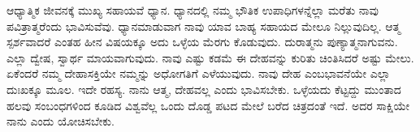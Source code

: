 ಆಧ್ಯಾತ್ಮಿಕ ಜೀವನಕ್ಕೆ ಮುಖ್ಯ ಸಹಾಯವೆ ಧ್ಯಾನ. ಧ್ಯಾನದಲ್ಲಿ ನಮ್ಮ ಭೌತಿಕ ಉಪಾಧಿಗಳನ್ನೆಲ್ಲಾ ಮರೆತು ನಾವು ಪವಿತ್ರಾತ್ಮರೆಂದು ಭಾವಿಸುವೆವು. ಧ್ಯಾನಮಾಡುವಾಗ ನಾವು ಯಾವ ಬಾಹ್ಯ ಸಹಾಯದ ಮೇಲೂ ನಿಲ್ಲುವುದಿಲ್ಲ. ಆತ್ಮ ಸ್ಪರ್ಶವಾದರೆ ಎಂತಹ ಹೀನ ವಿಷಯಕ್ಕೂ ಅದು ಒಳ್ಳೆಯ ಮೆರಗು ಕೊಡುವುದು. ದುರಾತ್ಮನು ಪುಣ್ಯಾತ್ಮನಾಗುವನು. ಎಲ್ಲಾ ದ್ವೇಷ, ಸ್ವಾರ್ಥ ಮಾಯವಾಗುವುದು. ನಾವು ಎಷ್ಟು ಕಡಮೆ ಈ ದೇಹವನ್ನು ಕುರಿತು ಚಿಂತಿಸಿದರೆ ಅಷ್ಟು ಮೇಲು. ಏಕೆಂದರೆ ನಮ್ಮ ದೇಹಾಸಕ್ತಿಯೇ ನಮ್ಮನ್ನು ಅಧೋಗತಿಗೆ ಎಳೆಯುವುದು. ನಾವು ದೇಹ ಎಂಬ\break ಭಾವನೆಯೇ ಎಲ್ಲಾ ದುಃಖಕ್ಕೂ ಮೂಲ. ಇದೇ ರಹಸ್ಯ. ನಾನು ಆತ್ಮ, ದೇಹವಲ್ಲ ಎಂದು ಭಾವಿಸಬೇಕು. ಒಳ್ಳೆಯದು ಕೆಟ್ಟದ್ದು ಮುಂತಾದ ಹಲವು ಸಂಬಂಧಗಳಿಂದ ಕೂಡಿದ ವಿಶ್ವವೆಲ್ಲ ಒಂದು ದೊಡ್ಡ ಪಟದ ಮೇಲೆ ಬರೆದ ಚಿತ್ರದಂತೆ ಇದೆ. ಅದರ ಸಾಕ್ಷಿಯೇ ನಾನು ಎಂದು ಯೋಚಿಸಬೇಕು.

